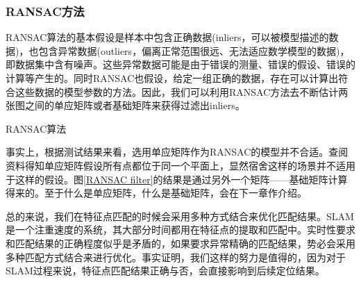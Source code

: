 \subsubsection{RANSAC方法}
RANSAC算法的基本假设是样本中包含正确数据(inliers，可以被模型描述的数据)，也包含异常数据(outliers，偏离正常范围很远、无法适应数学模型的数据)，即数据集中含有噪声。这些异常数据可能是由于错误的测量、错误的假设、错误的计算等产生的。同时RANSAC也假设，给定一组正确的数据，存在可以计算出符合这些数据的模型参数的方法。因此，我们可以利用RANSAC方法去不断估计两张图之间的单应矩阵或者基础矩阵来获得过滤出inliers。
\begin{algorithm}[htb]
	\SetAlgoLined

	\caption{RANSAC算法}
	\label{algo:RANSAC}
\end{algorithm}
\par
事实上，根据测试结果来看，选用单应矩阵作为RANSAC的模型并不合适。查阅资料得知单应矩阵假设所有点都位于同一个平面上，显然宿舍这样的场景并不适用于这样的假设。图\ref{RANSAC filter}的结果是通过另外一个矩阵——基础矩阵计算得来的。至于什么是单应矩阵，什么是基础矩阵，会在下一章作介绍。\par
总的来说，我们在特征点匹配的时候会采用多种方式结合来优化匹配结果。SLAM是一个注重速度的系统，其大部分时间都用在特征点的提取和匹配中。实时性要求和匹配结果的正确程度似乎是矛盾的，如果要求异常精确的匹配结果，势必会采用多种匹配方式结合来进行优化。事实证明，我们这样的努力是值得的，因为对于SLAM过程来说，特征点匹配结果正确与否，会直接影响到后续定位结果。











